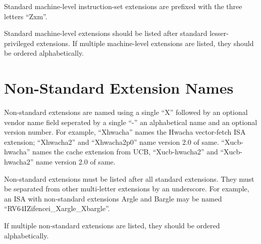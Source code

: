 Standard machine-level instruction-set extensions are prefixed with the three
letters ``Zxm''.

Standard machine-level extensions should be listed after standard
lesser-privileged extensions.  If multiple machine-level extensions are listed,
they should be ordered alphabetically.

\section{Non-Standard Extension Names}

Non-standard extensions are named using a single ``X'' followed by an optional vendor
name field seperated by a single ``-'' an alphabetical name and an optional version
number.
For example, ``Xhwacha'' names the Hwacha vector-fetch ISA extension;
``Xhwacha2'' and ``Xhwacha2p0'' name version 2.0 of same.
``Xucb-hwacha'' names the cache extension from UCB,
``Xucb-hwacha2'' and ``Xucb-hwacha2'' name version 2.0 of same.

Non-standard extensions must be listed after all standard extensions.
They must be separated from other multi-letter extensions
by an underscore.  For example, an ISA with non-standard extensions
Argle and Bargle may be named ``RV64IZifencei\_Xargle\_Xbargle''.

If multiple non-standard extensions are listed, they should be ordered
alphabetically.

